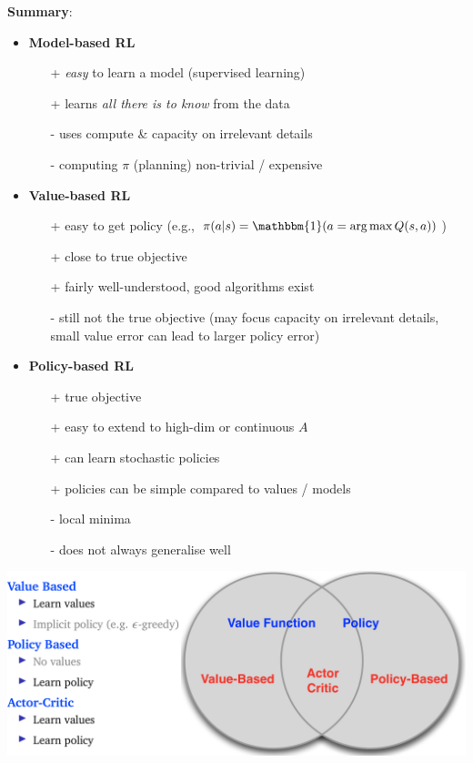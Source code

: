 \documentclass[10pt,landscape]{article}
\begin{document}
\begin{multicols}{3}
\newpage
\textbf{Summary}:
\begin{itemize}[leftmargin=4.5mm]
\item \textbf{Model-based RL} 
\begin{itemize}[leftmargin=2.5mm]
\item[+] \textit{easy} to learn a model (supervised learning)
\item[+] learns \textit{all there is to know} from the data
\item[-] uses compute \& capacity on irrelevant details
\item[-] computing $\pi$ (planning) non-trivial / expensive
\end{itemize}
\item \textbf{Value-based RL}
\begin{itemize}[leftmargin=2.5mm]
\item[+] easy to get policy (e.g., $\pi(a|s) = \mathbbm{1}(a = \arg\max Q(s, a))$)
\item[+] close to true objective
\item[+] fairly well-understood, good algorithms exist
\item[-] still not the true objective (may focus capacity on irrelevant details, small value error can lead to larger policy error)
\end{itemize}
\item \textbf{Policy-based RL}
\begin{itemize}[leftmargin=2.5mm]
\item[+] true objective
\item[+] easy to extend to high-dim or continuous $A$
\item[+] can learn stochastic policies
\item[+] policies can be simple compared to values / models
\item[-] local minima
\item[-] does not always generalise well
\end{itemize}
\end{itemize}

\includegraphics[width=0.9\linewidth]{./images/actorcritics.png}


\end{multicols}
\end{document}
